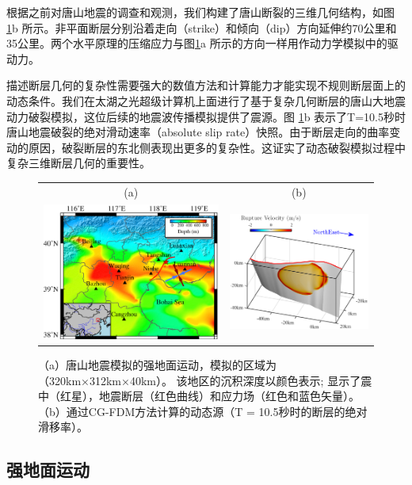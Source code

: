 \documentclass[degree=doctor]{thuthesis}
\begin{document}
根据之前对唐山地震的调查和观测，我们构建了唐山断裂的三维几何结构，如图\ref{fig:tangshan_geomap}b 所示。非平面断层分别沿着走向（strike）和倾向（dip）方向延伸约70公里和35公里。两个水平原理的压缩应力与图\ref{fig:tangshan_geomap}a 所示的方向一样用作动力学模拟中的驱动力。

描述断层几何的复杂性需要强大的数值方法和计算能力才能实现不规则断层面上的动态条件。我们在太湖之光超级计算机上面进行了基于复杂几何断层的唐山大地震动力破裂模拟，这位后续的地震波传播模拟提供了震源。图 \ref{fig:tangshan_geomap}b 表示了T=10.5秒时唐山地震破裂的绝对滑动速率（absolute slip rate）快照。由于断层走向的曲率变动的原因，破裂断层的东北侧表现出更多的复杂性。这证实了动态破裂模拟过程中复杂三维断层几何的重要性。

\begin{figure}[t]
\begin{tabular}{cc}
(a) & (b) \\
    \includegraphics[width=0.5\columnwidth]{Tangshan_geomap.eps} &
    \includegraphics[width=0.5\columnwidth]{Tangshan_Fault1.eps}
\end{tabular}
    \caption{
（a）唐山地震模拟的强地面运动，模拟的区域为（320km×312km×40km）。 该地区的沉积深度以颜色表示; 显示了震中（红星），地震断层（红色曲线）和应力场（红色和蓝色矢量）。 （b）通过CG-FDM方法计算的动态源（T = 10.5秒时的断层的绝对滑移率）。}
    \label{fig:tangshan_geomap}
\end{figure}


\subsection{强地面运动}
\end{document}
